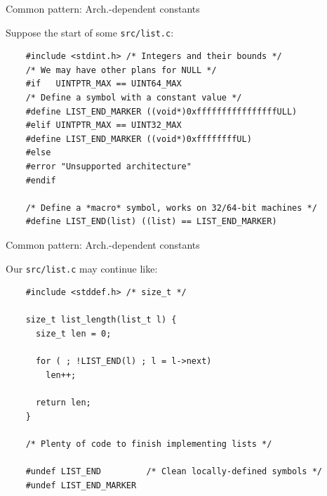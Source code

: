 \begin{frame}[fragile]{Common pattern: Arch.-dependent constants}

  Suppose the start of some \lstinline{src/list.c}:
  
  \begin{lstlisting}
    #include <stdint.h> /* Integers and their bounds */
    /* We may have other plans for NULL */
    #if   UINTPTR_MAX == UINT64_MAX
    /* Define a symbol with a constant value */
    #define LIST_END_MARKER ((void*)0xffffffffffffffffULL)
    #elif UINTPTR_MAX == UINT32_MAX
    #define LIST_END_MARKER ((void*)0xffffffffUL)
    #else
    #error "Unsupported architecture"
    #endif

    /* Define a *macro* symbol, works on 32/64-bit machines */
    #define LIST_END(list) ((list) == LIST_END_MARKER)
  \end{lstlisting}
  
\end{frame}

\begin{frame}[fragile]{Common pattern: Arch.-dependent constants}

  Our \lstinline{src/list.c} may continue like:
  
  \begin{lstlisting}
    #include <stddef.h> /* size_t */

    size_t list_length(list_t l) {
      size_t len = 0;

      for ( ; !LIST_END(l) ; l = l->next)
        len++;

      return len;
    }
    
    /* Plenty of code to finish implementing lists */

    #undef LIST_END         /* Clean locally-defined symbols */
    #undef LIST_END_MARKER
  \end{lstlisting}

\end{frame}

